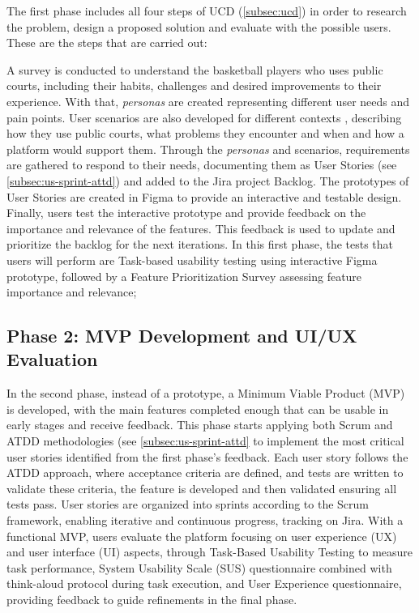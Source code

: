 The first phase includes all four steps of UCD (\ref{subsec:ucd}) in order to research the problem, design a proposed solution and evaluate with the possible users. These are the steps that are carried out:

A survey is conducted to understand the basketball players who uses public courts, including their habits, challenges and desired improvements to their experience. With that, \textit{personas} are created representing different user needs and pain points. User scenarios are also developed for different contexts , describing how they use public courts, what problems they encounter and when and how a platform would support them. Through the \textit{personas} and scenarios, requirements are gathered to respond to their needs, documenting them as User Stories (see \ref{subsec:us-sprint-attd}) and added to the Jira project Backlog. The prototypes of User Stories are created in Figma to provide an interactive and testable design. Finally, users test the interactive prototype and provide feedback on the importance and relevance of the features. This feedback is used to update and prioritize the backlog for the next iterations. In this first phase, the tests that users will perform are Task-based usability testing using interactive Figma prototype, followed by a Feature Prioritization Survey assessing feature importance and relevance;

\subsection{Phase 2: MVP Development and UI/UX Evaluation}

In the second phase, instead of a prototype, a Minimum Viable Product (MVP) is developed, with the main features completed enough that can be usable in early stages and receive feedback. This phase starts applying both Scrum and ATDD methodologies (see \ref{subsec:us-sprint-attd} to implement the most critical user stories identified from the first phase's feedback. Each user story follows the ATDD approach, where acceptance criteria are defined, and tests are written to validate these criteria, the feature is developed and then validated ensuring all tests pass. User stories are organized into sprints according to the Scrum framework, enabling iterative and continuous progress, tracking on Jira. With a functional MVP, users evaluate the platform focusing on user experience (UX) and user interface (UI) aspects, through Task-Based Usability Testing to measure task performance, System Usability Scale (SUS) questionnaire combined with think-aloud protocol during task execution, and User Experience questionnaire, providing feedback to guide refinements in the final phase.

